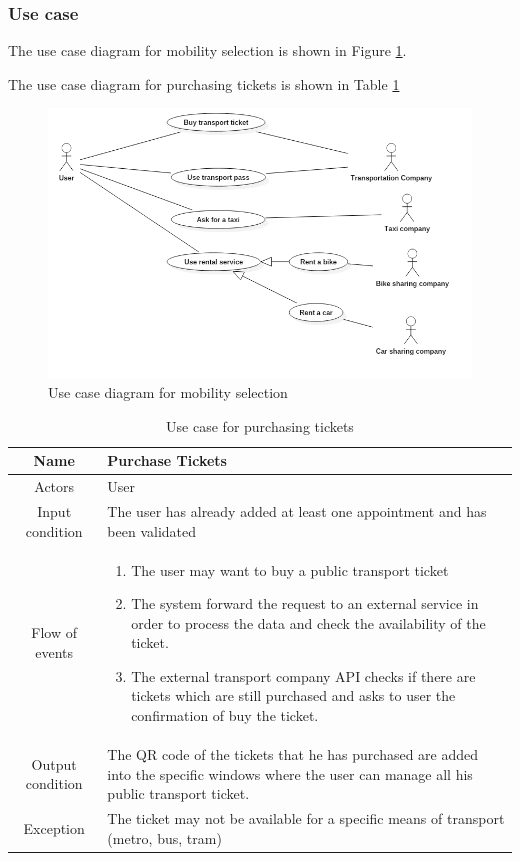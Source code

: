\subsubsection{Use case}
The use case diagram for mobility selection is shown in Figure \ref{fig:useCaseMobility}.

The use case diagram for purchasing tickets is shown in Table \ref{usecase_tickets}
\begin{figure}
	\centering
	\includegraphics[width=6in]{./diagrams/TransportationUseCase.png}
	\caption{Use case diagram for mobility selection}
	\label{fig:useCaseMobility}
\end{figure}

\begin{table}
	\centering
	\begin{tabular}{|c||p{}|}
		\hline
		Name & Purchase Tickets \\ \hline
		Actors & User \\  \hline
		Input condition & The user has already added at least one appointment and has been validated \\ \hline
		Flow of events & \begin{enumerate}
			\item The user may want to buy a public transport ticket
			\item The system forward the request to an external service in order to process the data and check the availability of the ticket.
			\item The external transport company API checks if there are tickets which are still purchased and asks to user the confirmation of buy the ticket.
		\end{enumerate} \\ \hline
		Output condition & The QR code of the tickets that he has purchased are added into the specific windows where the user can manage all his public transport ticket. \\ \hline
		Exception & The ticket may not be available for a specific means of transport (metro, bus, tram) \\ \hline
	\end{tabular}
	\caption{Use case for purchasing tickets}
	\label{usecase_tickets}
\end{table}

